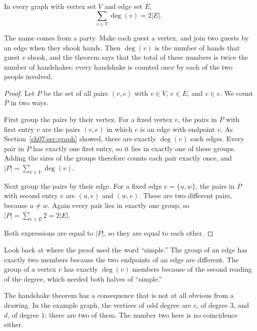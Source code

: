 \par\noindent\begin{minipage}{\linewidth}
\begin{theorem}\label{thm:handshake}
In every graph with vertex set $V$ and edge set $E$,
\[
\sum_{v\in V}\deg(v)=2|E|.
\]
\end{theorem}
\end{minipage}\par

The name comes from a party. Make each guest a vertex, and join two guests by an edge when they shook hands. Then $\deg(v)$ is the number of hands that guest $v$ shook, and the theorem says that the total of these numbers is twice the number of handshakes: every handshake is counted once by each of the two people involved.

\begin{proof}
Let $P$ be the set of all pairs $(v,e)$ with $v\in V$, $e\in E$, and $v\in e$. We count $P$ in two ways.

First group the pairs by their vertex. For a fixed vertex $v$, the pairs in $P$ with first entry $v$ are the pairs $(v,e)$ in which $e$ is an edge with endpoint $v$. As Section~\ref{ch07:sec:graph} showed, there are exactly $\deg(v)$ such edges. Every pair in $P$ has exactly one first entry, so it lies in exactly one of these groups. Adding the sizes of the groups therefore counts each pair exactly once, and $|P|=\sum_{v\in V}\deg(v)$.

Next group the pairs by their edge. For a fixed edge $e=\{u,w\}$, the pairs in $P$ with second entry $e$ are $(u,e)$ and $(w,e)$. These are two different pairs, because $u\ne w$. Again every pair lies in exactly one group, so $|P|=\sum_{e\in E}2=2|E|$.

Both expressions are equal to $|P|$, so they are equal to each other.
\end{proof}

Look back at where the proof used the word ``simple.'' The group of an edge has exactly two members because the two endpoints of an edge are different. The group of a vertex $v$ has exactly $\deg(v)$ members because of the second reading of the degree, which needed both halves of ``simple.''

The handshake theorem has a consequence that is not at all obvious from a drawing. In the example graph, the vertices of odd degree are $c$, of degree $3$, and $d$, of degree $1$: there are two of them. The number two here is no coincidence either.

